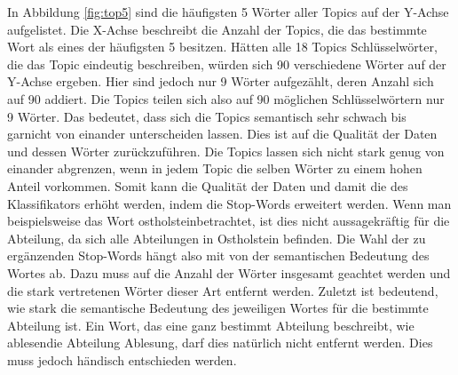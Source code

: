 \documentclass[german,version-2020-11]{uzl-thesis}
\begin{document}
In Abbildung \ref{fig:top5} sind die häufigsten 5 Wörter aller Topics auf der Y-Achse aufgelistet. Die X-Achse beschreibt die Anzahl der Topics, die das bestimmte Wort als eines der häufigsten 5 besitzen. Hätten alle 18 Topics Schlüsselwörter, die das Topic eindeutig beschreiben, würden sich 90 verschiedene Wörter auf der Y-Achse ergeben. Hier sind jedoch nur 9 Wörter aufgezählt, deren Anzahl sich auf 90 addiert. Die Topics teilen sich also auf 90 möglichen Schlüsselwörtern nur 9 Wörter. Das bedeutet, dass sich die Topics semantisch sehr schwach bis garnicht von einander unterscheiden lassen. Dies ist auf die Qualität der Daten und dessen Wörter zurückzuführen. Die Topics lassen sich nicht stark genug von einander abgrenzen, wenn in jedem Topic die selben Wörter zu einem hohen Anteil vorkommen. Somit kann die Qualität der Daten und damit die des Klassifikators erhöht werden, indem die Stop-Words erweitert werden. Wenn man beispielsweise das Wort \glqq ostholstein\grqq betrachtet, ist dies nicht aussagekräftig für die Abteilung, da sich alle Abteilungen in Ostholstein befinden. Die Wahl der zu ergänzenden Stop-Words hängt also mit von der semantischen Bedeutung des Wortes ab. Dazu muss auf die Anzahl der Wörter insgesamt geachtet werden und die stark vertretenen Wörter dieser Art entfernt werden. Zuletzt ist bedeutend, wie stark die semantische Bedeutung des jeweiligen Wortes für die bestimmte Abteilung ist. Ein Wort, das eine ganz bestimmt Abteilung beschreibt, wie \glqq ablesen\grqq die Abteilung \grqq Ablesung\grqq, darf dies natürlich nicht entfernt werden. Dies muss jedoch händisch entschieden werden.
\\

\end{document}
